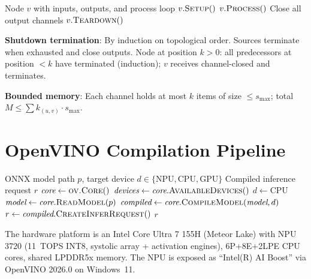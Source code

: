 \documentclass[11pt,a4paper,twoside]{article}
\theoremstyle{definition}
\theoremstyle{remark}
\begin{document}
\begin{algorithm}[H]
\caption{\textsc{RunNode}: Single node lifecycle}
\label{alg:runnode}
\begin{algorithmic}[1]
\Require Node $v$ with inputs, outputs, and process loop
\State $v.\textsc{Setup}()$ 
\Try
  \State $v.\textsc{Process}()$ 
  \State Close all output channels 
\EndTry
\State $v.\textsc{Teardown}()$
\end{algorithmic}
\end{algorithm}

\textbf{Shutdown termination}: By induction on topological order. Sources terminate when exhausted and close outputs. Node at position $k > 0$: all predecessors at position $< k$ have terminated (induction); $v$ receives channel-closed and terminates.

\textbf{Bounded memory}: Each channel holds at most $k$ items of size $\leq s_{\max}$; total $M \leq \sum k_{(u,v)} \cdot s_{\max}$.

\section{OpenVINO Compilation Pipeline}
\label{app:openvino}

\begin{algorithm}[H]
\caption{OpenVINO Model Compilation}
\label{alg:openvino}
\begin{algorithmic}[1]
\Require ONNX model path $p$, target device $d \in \{\text{NPU}, \text{CPU}, \text{GPU}\}$
\Ensure Compiled inference request $r$
\State $\textit{core} \gets \textsc{ov.Core}()$ 
\State $\textit{devices} \gets \textit{core}.\textsc{AvailableDevices}()$
  \State $d \gets \text{CPU}$ 
\EndIf
\State $\textit{model} \gets \textit{core}.\textsc{ReadModel}(p)$ 
\State $\textit{compiled} \gets \textit{core}.\textsc{CompileModel}(\textit{model}, d)$ 
\State $r \gets \textit{compiled}.\textsc{CreateInferRequest}()$ 
\State \Return $r$
\end{algorithmic}
\end{algorithm}

The hardware platform is an Intel Core Ultra 7 155H (Meteor Lake) with NPU 3720 (11~TOPS INT8, systolic array + activation engines), 6P+8E+2LPE CPU cores, shared LPDDR5x memory. The NPU is exposed as ``Intel(R) AI Boost'' via OpenVINO 2026.0 on Windows~11.
\end{document}

